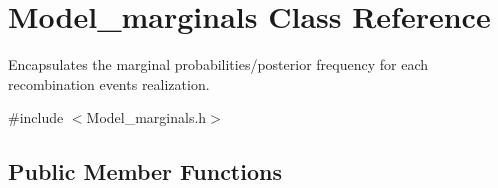 \hypertarget{classModel__marginals}{}\section{Model\+\_\+marginals Class Reference}
\label{classModel__marginals}


Encapsulates the marginal probabilities/posterior frequency for each recombination event\textquotesingle{}s realization.  




{\ttfamily \#include $<$Model\+\_\+marginals.\+h$>$}

\subsection*{Public Member Functions}
